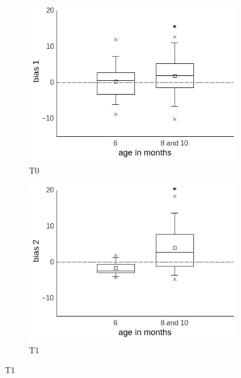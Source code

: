 \documentclass[a4paper]{scrreprt}
\begin{document}
\begin{figure}
\centering
    \begin{subfigure}[b]{0.49\textwidth}
        \includegraphics[width=\textwidth]{figs/sec3/age/age2_diff1_dat.jpeg}
        \caption{T0}
    \end{subfigure}
\begin{subfigure}[b]{0.49\textwidth}
        \includegraphics[width=\textwidth]{figs/sec3/age/age2_diff2_dat.jpeg}
        \caption{T1}
    \end{subfigure}
    

\end{figure}
\end{document}
